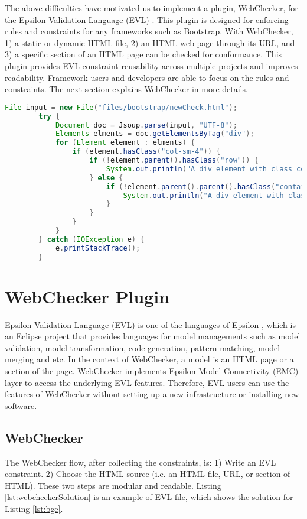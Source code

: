 \documentclass[conference]{IEEETran}
\begin{document}
The above difficulties have motivated us to implement a plugin, WebChecker, for the Epsilon Validation Language (EVL) \cite{Kolovos2009}.  This plugin is designed for enforcing rules and constraints for any frameworks such as Bootstrap. With WebChecker, 1) a static or dynamic HTML file, 2) an HTML web page through its URL, and 3) a specific section of an HTML page can be checked for conformance. This plugin provides EVL constraint reusability across multiple projects and improves readability. Framework users and developers are able to focus on the rules and constraints. The next section explains WebChecker in more details.    

\begin{lstlisting}[language=Java, caption=Enforcing Bootstrap Grid Rule, label={lst:ebgr}]
		File input = new File("files/bootstrap/newCheck.html");
		try {
			Document doc = Jsoup.parse(input, "UTF-8");
			Elements elments = doc.getElementsByTag("div");
			for (Element element : elments) {
				if (element.hasClass("col-sm-4")) {					
					if (!element.parent().hasClass("row")) {
						System.out.println("A div element with class col should have a parent element with class row");
					} else {
						if (!element.parent().parent().hasClass("container")) {
							System.out.println("A div element with class col should have a parent element with class row, which has a parent with class container.");
						}
					}
				}
			}		
		} catch (IOException e) {
			e.printStackTrace();
		}
\end{lstlisting}


\section{WebChecker Plugin}
Epsilon Validation Language (EVL) \cite{Kolovos2009} is one of the languages of Epsilon \cite{EpsilonProject}, which is an Eclipse project that provides languages for model managements such as model validation, model transformation, code generation, pattern matching, model merging and etc. In the context of WebChecker, a model is an HTML page or a section of the page. WebChecker implements Epsilon Model Connectivity (EMC) layer to access the underlying EVL features. Therefore, EVL users can use the features of WebChecker without setting up a new infrastructure or installing new software.      

\subsection{WebChecker}
The WebChecker flow, after collecting the constraints, is: 
1) Write an EVL constraint.
2) Choose the HTML source (i.e. an HTML file, URL, or section of HTML).
These two steps are modular and readable. Listing \ref{lst:webcheckerSolution} is an example of EVL file, which shows the solution for Listing \ref{lst:bge}. 
\end{document}
